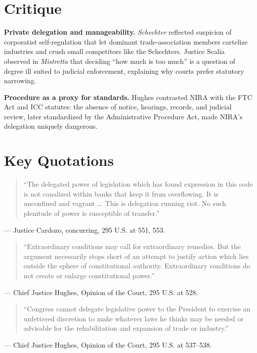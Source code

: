 \documentclass[12pt]{article}
\begin{document}
\section{Critique}

\textbf{Private delegation and manageability.} \textit{Schechter} reflected suspicion of corporatist self-regulation that let dominant trade-association members cartelize industries and crush small competitors like the Schechters. Justice Scalia observed in \textit{Mistretta} that deciding ``how much is too much'' is a question of degree ill suited to judicial enforcement, explaining why courts prefer statutory narrowing.

\textbf{Procedure as a proxy for standards.} Hughes contrasted NIRA with the FTC Act and ICC statutes: the absence of notice, hearings, records, and judicial review, later standardized by the Administrative Procedure Act, made NIRA's delegation uniquely dangerous.

\section{Key Quotations}

\begin{quote}
``The delegated power of legislation which has found expression in this code is not canalized within banks that keep it from overflowing. It is unconfined and vagrant \dots\ This is delegation running riot. No such plenitude of power is susceptible of transfer.''
\end{quote}
\noindent --- Justice Cardozo, concurring, 295 U.S. at 551, 553.

\begin{quote}
``Extraordinary conditions may call for extraordinary remedies. But the argument necessarily stops short of an attempt to justify action which lies outside the sphere of constitutional authority. Extraordinary conditions do not create or enlarge constitutional power.''
\end{quote}
\noindent --- Chief Justice Hughes, Opinion of the Court, 295 U.S. at 528.

\begin{quote}
``Congress cannot delegate legislative power to the President to exercise an unfettered discretion to make whatever laws he thinks may be needed or advisable for the rehabilitation and expansion of trade or industry.''
\end{quote}
\noindent --- Chief Justice Hughes, Opinion of the Court, 295 U.S. at 537--538.
\end{document}
